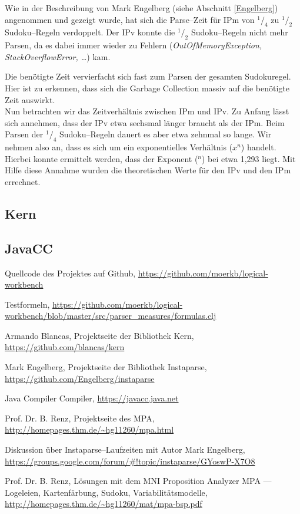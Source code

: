\documentclass[ngerman,a4paper,abstracton,open=right,twoside=false,toc=listofnumbered,bibtotocnumbered]{scrreprt}
\begin{document}
Wie in der Beschreibung von Mark Engelberg (siehe Abschnitt \ref{Engelberg}) angenommen und gezeigt wurde, hat sich die Parse--Zeit für IPm von $^1/_4$ zu $^1/_2$ Sudoku--Regeln verdoppelt. Der IPv konnte die $^1/_2$ Sudoku--Regeln nicht mehr Parsen, da es dabei immer wieder zu Fehlern (\emph{OutOfMemoryException, StackOverflowError, \dots}) kam.

Die benötigte Zeit vervierfacht sich fast zum Parsen der gesamten Sudokuregel. Hier ist zu erkennen, dass sich die Garbage Collection massiv auf die benötigte Zeit auswirkt.\\

Nun betrachten wir das Zeitverhältnis zwischen IPm und IPv. Zu Anfang lässt sich annehmen, dass der IPv etwa sechsmal länger braucht als der IPm. Beim Parsen der $^1/_4$ Sudoku--Regeln dauert es aber etwa zehnmal so lange. Wir nehmen also an, dass es sich um ein exponentielles Verhältnis ($x^n$) handelt. Hierbei konnte ermittelt werden, dass der Exponent ($^n$) bei etwa 1,293 liegt. Mit Hilfe diese Annahme wurden die theoretischen Werte für den IPv und den IPm errechnet.

\subsection{Kern}




\subsection{JavaCC}

\appendix

\begin{thebibliography}{7}
		Quellcode des Projektes auf Github, 
		\url{https://github.com/moerkb/logical-workbench}

		Testformeln,
		\url{https://github.com/moerkb/logical-workbench/blob/master/src/parser_measures/formulas.clj}

		Armando Blancas,
		Projektseite der Bibliothek Kern, 
		\url{https://github.com/blancas/kern}

		Mark Engelberg,
		Projektseite der Bibliothek Instaparse,
		\url{https://github.com/Engelberg/instaparse}

		Java Compiler Compiler,
		\url{https://javacc.java.net}

		Prof. Dr. B. Renz,
		Projektseite des MPA,
		\url{http://homepages.thm.de/~hg11260/mpa.html}

		Diskussion über Instaparse--Laufzeiten mit Autor Mark Engelberg, 
		\url{https://groups.google.com/forum/#!topic/instaparse/GYoswP-X7O8}

		Prof. Dr. B. Renz,
		Lösungen mit dem MNI Proposition Analyzer MPA --- Logeleien, Kartenfärbung, Sudoku, Variabilitätsmodelle,
		\url{http://homepages.thm.de/~hg11260/mat/mpa-bsp.pdf}
\end{thebibliography}
\end{document}
